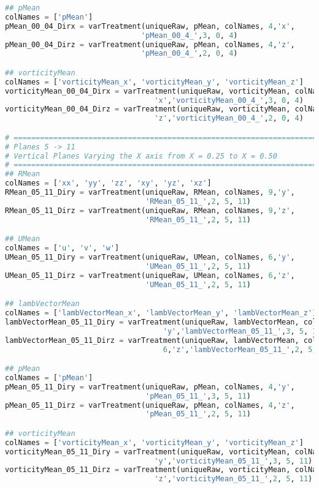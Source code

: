 \begin{lstlisting}[language=python]
## pMean
colNames = ['pMean']
pMean_00_04_Dirx = varTreatment(uniqueRaw, pMean, colNames, 4,'x',
                               'pMean_00_4_',3, 0, 4)
pMean_00_04_Dirz = varTreatment(uniqueRaw, pMean, colNames, 4,'z',
                               'pMean_00_4_',2, 0, 4)

## vorticityMean
colNames = ['vorticityMean_x', 'vorticityMean_y', 'vorticityMean_z']
vorticityMean_00_04_Dirx = varTreatment(uniqueRaw, vorticityMean, colNames, 6,
                                  'x','vorticityMean_00_4_',3, 0, 4)
vorticityMean_00_04_Dirz = varTreatment(uniqueRaw, vorticityMean, colNames, 6,
                                  'z','vorticityMean_00_4_',2, 0, 4)

# =============================================================================
# Planes 5 -> 11
# Vertical Planes Varying the X axis from X = 0.25 to X = 0.50
# =============================================================================
## RMean
colNames = ['xx', 'yy', 'zz', 'xy', 'yz', 'xz']
RMean_05_11_Diry = varTreatment(uniqueRaw, RMean, colNames, 9,'y',
                                'RMean_05_11_',2, 5, 11)
RMean_05_11_Dirz = varTreatment(uniqueRaw, RMean, colNames, 9,'z',
                                'RMean_05_11_',2, 5, 11)

## UMean
colNames = ['u', 'v', 'w']
UMean_05_11_Diry = varTreatment(uniqueRaw, UMean, colNames, 6,'y',
                                'UMean_05_11_',2, 5, 11)
UMean_05_11_Dirz = varTreatment(uniqueRaw, UMean, colNames, 6,'z',
                                'UMean_05_11_',2, 5, 11)

## lambVectorMean
colNames = ['lambVectorMean_x', 'lambVectorMean_y', 'lambVectorMean_z']
lambVectorMean_05_11_Diry = varTreatment(uniqueRaw, lambVectorMean, colNames, 6,
                                    'y','lambVectorMean_05_11_',3, 5, 11)
lambVectorMean_05_11_Dirz = varTreatment(uniqueRaw, lambVectorMean, colNames,
                                    6,'z','lambVectorMean_05_11_',2, 5, 11)

## pMean
colNames = ['pMean']
pMean_05_11_Diry = varTreatment(uniqueRaw, pMean, colNames, 4,'y',
                                'pMean_05_11_',3, 5, 11)
pMean_05_11_Dirz = varTreatment(uniqueRaw, pMean, colNames, 4,'z',
                                'pMean_05_11_',2, 5, 11)

## vorticityMean
colNames = ['vorticityMean_x', 'vorticityMean_y', 'vorticityMean_z']
vorticityMean_05_11_Diry = varTreatment(uniqueRaw, vorticityMean, colNames, 6,
                                  'y','vorticityMean_05_11_',3, 5, 11)
vorticityMean_05_11_Dirz = varTreatment(uniqueRaw, vorticityMean, colNames, 6,
                                  'z','vorticityMean_05_11_',2, 5, 11)


\end{lstlisting}
